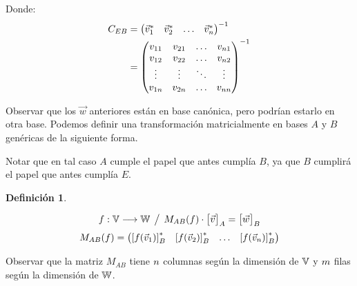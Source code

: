 \documentclass[a5paper,12pt,twoside]{book}
\newtheorem{defn}{{Definición}}[chapter]
\begin{document}
Donde:
\begin{align*}
    C_{EB} &=
    \begin{pmatrix}
        \Vec{v}_1^* & \Vec{v}_2^* & \dots & \Vec{v}_n^*
    \end{pmatrix}^{-1}
    \\
    &=
    \begin{pmatrix}
        v_{11} & v_{21} & \dots & v_{n 1}
        \\
        v_{12} & v_{22} & \dots & v_{n 2}
        \\
        \vdots & \vdots & \ddots & \vdots
        \\
        v_{1 n} & v_{2 n} & \dots & v_{n n}
    \end{pmatrix}^{-1}
\end{align*}

Observar que los $\Vec{w}$ anteriores están en base canónica, pero podrían estarlo en otra base. Podemos definir una transformación matricialmente en bases $A$ y $B$ genéricas de la siguiente forma.

Notar que en tal caso $A$ cumple el papel que antes cumplía $B$, ya que $B$ cumplirá el papel que antes cumplía $E$.

\begin{mdframed}[style=MyFrame1]
    \begin{defn}
    \end{defn}
    \begin{equation*}
        f: \mathbb{V} \longrightarrow \mathbb{W} \hspace{1ex} \big/ \hspace{1ex} M_{AB}(f) \cdot { \begin{bmatrix} \Vec{v} \end{bmatrix} }_A = { \begin{bmatrix} \Vec{w} \end{bmatrix} }_B
    \end{equation*}
    \begin{equation*}
        M_{AB} (f) =
        \begin{pmatrix}
            \left[f(\Vec{v}_1)\right]_{B}^* &
            \left[f(\Vec{v}_2)\right]_{B}^* &
            \dots &
            \left[f(\Vec{v}_n)\right]_{B}^*
        \end{pmatrix}
    \end{equation*}
\end{mdframed}

Observar que la matriz $M_{AB}$ tiene $n$ columnas según la dimensión de $\mathbb{V}$ y $m$ filas según la dimensión de $\mathbb{W}$.
\end{document}
